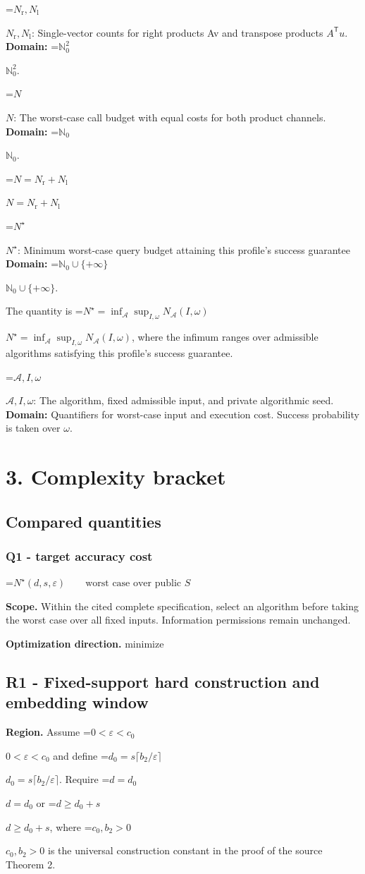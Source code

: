 \documentclass[10pt,a4paper]{article}
\newcommand{\AtlasMath}[1]{\par\begingroup\centering\setbox0=\hbox{$\displaystyle #1$}\ifdim\wd0>1.4\linewidth\typeout{ATLAS WIDE FORMULA: \the\wd0}\fi\ifdim\wd0>\linewidth\resizebox{\linewidth}{!}{\box0}\else\box0\fi\par\endgroup}
\newcommand{\AtlasInlineMath}[1]{\begingroup\setbox0=\hbox{$#1$}\ifdim\wd0>.4\linewidth\endgroup\AtlasMath{#1}\else\endgroup$#1$\fi}
\begin{document}
\AtlasInlineMath{N_{\mathrm r},N_{\mathrm l}}: Single-vector counts for right products Av and transpose products $A^{\mathsf T}u$. \textbf{Domain:} \AtlasInlineMath{\mathbb N_0^2}.

\AtlasInlineMath{N}: The worst-case call budget with equal costs for both product channels. \textbf{Domain:} \AtlasInlineMath{\mathbb N_0}.

\AtlasInlineMath{N=N_{\mathrm r}+N_{\mathrm l}}

\AtlasInlineMath{N^\star}: Minimum worst-case query budget attaining this profile's success guarantee \textbf{Domain:} \AtlasInlineMath{\mathbb N_0\cup\{+\infty\}}.

The quantity is \AtlasInlineMath{N^\star=\inf_{\mathcal A}\sup_{I,\omega}N_{\mathcal A}(I,\omega)}, where the infimum ranges over admissible algorithms satisfying this profile's success guarantee.

\AtlasInlineMath{\mathcal A,I,\omega}: The algorithm, fixed admissible input, and private algorithmic seed. \textbf{Domain:} Quantifiers for worst-case input and execution cost. Success probability is taken over $\omega$.

\section{3. Complexity bracket}
\subsection{Compared quantities}
\subsubsection{Q1 - target accuracy cost}
\AtlasMath{N^\star(d,s,\varepsilon)\qquad\text{worst case over public }S}
\textbf{Scope.} Within the cited complete specification, select an algorithm before taking the worst case over all fixed inputs. Information permissions remain unchanged.

\textbf{Optimization direction.} minimize

\subsection{R1 - Fixed-support hard construction and embedding window}
\textbf{Region.} Assume \AtlasInlineMath{0<\varepsilon<c_0} and define \AtlasInlineMath{d_0=s\lceil b_2/\varepsilon\rceil}. Require \AtlasInlineMath{d=d_0} or \AtlasInlineMath{d\ge d_0+s}, where \AtlasInlineMath{c_0,b_2>0} is the universal construction constant in the proof of the source Theorem 2.
\end{document}
